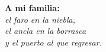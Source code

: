 %
%
\label{sec:dedication}

\begin{flushright}
    \thispagestyle{empty}

        \textbf{{A mi familia:}}\\

    \textit{el faro en la niebla,} \\
    \textit{el ancla en la borrasca}\\
    \textit{y el puerto al que regresar.}\\
\end{flushright}
